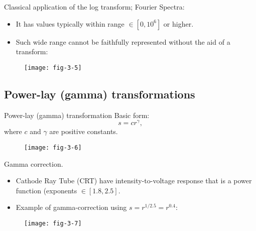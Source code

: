 
\begin{frame}
Classical application of the log transform; Fourier Spectra:
\begin{itemize}
\item It has values typically within range $\in[0,10^{6}]$ or higher.
\item Such wide range cannot be faithfully represented without the aid of a transform:
\end{itemize} 
\begin{figure}
\centering
\texttt{[image: fig-3-5]}
\end{figure}\end{frame}


\subsection{Power-lay (gamma) transformations}


\begin{frame}{Power-lay (gamma) transformation}
Basic form:
\begin{equation}
s = cr^{\gamma},
\end{equation}
where $c$ and $\gamma$ are positive constants.
\begin{figure}
\centering
\texttt{[image: fig-3-6]}
\end{figure}
\end{frame}


\begin{frame}
Gamma correction.
\begin{itemize}
\item Cathode Ray Tube (CRT) have intensity-to-voltage response that is a power function (exponents $\in[1.8,2.5]$.
\item Example of gamma-correction using $s=r^{1/2.5}=r^{0.4}$:
\end{itemize}
\begin{figure}
\centering
\texttt{[image: fig-3-7]}
\end{figure}
\end{frame}

